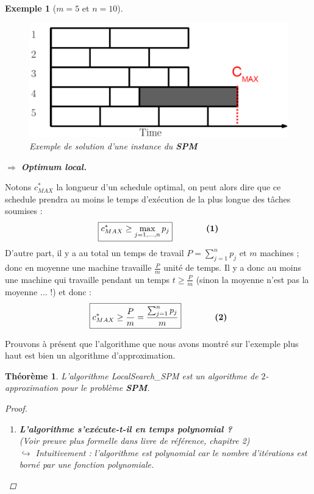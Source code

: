 \documentclass{article}
\newcommand{\titre}[1]{\textcolor{title}{#1}}
\newtheorem{exemple}{Exemple}[section]
\newtheorem{thm}{Th\'eor\`eme}[section]
\newtheorem{proof}{Preuve}[section]
\begin{document}
\begin{sffamily}
\begin{exemple}[$m=5$ et $n=10$]
\begin{figure}[h!]
    \begin{center}
    \includegraphics[scale=0.5]{spm2.pdf}
    \caption{Exemple de solution d'une instance du \textbf{\titre{SPM}}}
    \end{center}	
\end{figure}

$\Longrightarrow$ \textbf{Optimum local.}
\end{exemple}

\newpage

Notons $c^*_{MAX}$ la longueur d'un schedule optimal, on peut alors dire que ce schedule prendra au moins le temps d'exécution de la plus 
longue des tâches soumises :
$$\boxed{c^*_{MAX} \geq \max_{j=1,\ldots,n} p_j} \qquad\qquad \text{\textbf{(1)}}$$
D'autre part, il y a au total un temps de travail $P = \sum_{j=1}^n p_j$ et $m$ machines ; donc en
moyenne une machine travaille $\frac{P}{m}$ unité de temps. Il y a donc au moins
une machine qui travaille pendant un temps $t \geq \frac{P}{m}$ (sinon la moyenne n'est pas la moyenne $\ldots$ !) et donc :
$$\boxed{c^*_{MAX} \geq \frac{P}{m} = \frac{\sum_{j=1}^n p_j}{m}} \qquad\qquad \text{\textbf{(2)}}$$

Prouvons à présent que l'algorithme que nous avons montré sur l'exemple plus haut est bien un algorithme d'approximation.

\begin{thm}L'algorithme LocalSearch\_SPM est un algorithme de $2$-approximation pour le problème \textbf{\titre{SPM}}.
\begin{proof}$ $\\
\begin{enumerate}
\item \textbf{L'algorithme s'exécute-t-il en temps polynomial ?}\\ (Voir preuve plus formelle dans livre de référence, chapitre 2) \\
$\hookrightarrow$ Intuitivement : l'algorithme est polynomial car le nombre d'itérations est borné par une fonction polynomiale.


\end{enumerate}
\end{proof}
\end{thm}
\end{sffamily}
\end{document}
